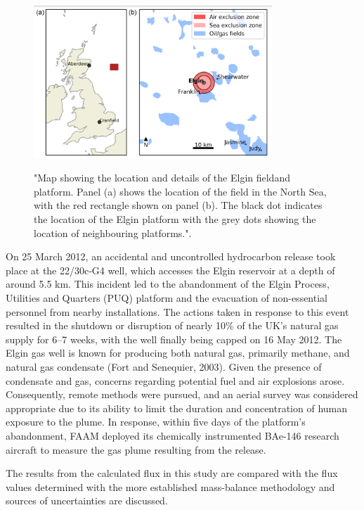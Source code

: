\documentclass[12pt]{article}
\begin{document}
\begin{figure}[H]
\centering
\includegraphics[width=0.8\textwidth]{Plots/elginmap.png}
\caption{\label{fig:elgin}} "Map showing the location and details of the Elgin fieldand platform. Panel (a) shows the location of the field in the North Sea, with the red rectangle shown on panel (b). The black dot indicates the location of the Elgin platform with the grey dots showing
the location of neighbouring platforms."\parencite[]{Lee2018FlowRelease}.
 
\end{figure}


On 25 March 2012, an accidental and uncontrolled hydrocarbon release took place at the 22/30c-G4 well, which accesses the Elgin reservoir at a depth of around 5.5 km. This incident led to the abandonment of the Elgin Process, Utilities and Quarters (PUQ) platform and the evacuation of non-essential personnel from nearby installations. The actions taken in response to this event resulted in the shutdown or disruption of nearly 10\% of the UK's natural gas supply for 6–7 weeks, with the well finally being capped on 16 May 2012.
The Elgin gas well is known for producing both natural gas, primarily methane, and natural gas condensate (Fort and Senequier, 2003). Given the presence of condensate and gas, concerns regarding potential fuel and air explosions arose.  Consequently, remote methods were pursued, and an aerial survey was considered appropriate due to its ability to limit the duration and concentration of human exposure to the plume.
In response, within five days of the platform's abandonment, FAAM deployed its chemically instrumented BAe-146 research aircraft to measure the gas plume resulting from the release.

The results from the calculated flux in this study  are compared with the flux values determined with the more established mass-balance methodology\parencite{Lee2018FlowRelease} and sources of uncertainties are discussed.
\end{document}
